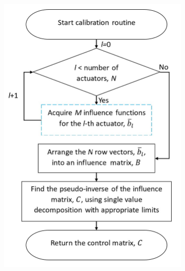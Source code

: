 \begin{figure}[h]
	\centering
	\begin{subfigure}{0.45\textwidth}
		\centering
		\includegraphics[width=1\linewidth, scale=0.5]{images/calibration_routine_workflow.jpg}
		\caption{}
		\label{fig:calibration_routine_workflow}
	\end{subfigure}
	\begin{subfigure}{0.45\textwidth}
		\centering

\end{subfigure}
\end{figure}
